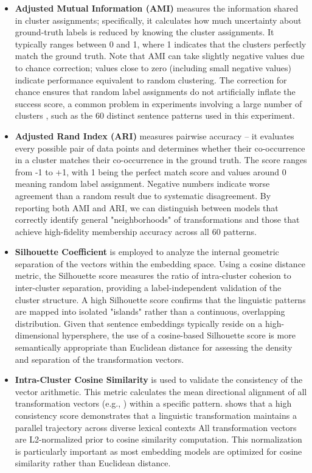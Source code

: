 \begin{itemize}
    \item \textbf{Adjusted Mutual Information (AMI)} \citep{JMLR:v11:vinh10a} measures the information shared in cluster assignments; specifically, it calculates how much uncertainty about ground-truth labels is reduced by knowing the cluster assignments. It typically ranges between 0 and 1, where 1 indicates that the clusters perfectly match the ground truth. Note that AMI can take slightly negative values due to chance correction; values close to zero (including small negative values) indicate performance equivalent to random clustering.
    The correction for chance ensures that random label assignments do not artificially inflate the success score, a common problem in experiments involving a large number of clusters \citep{JMLR:v11:vinh10a}, such as the 60 distinct sentence patterns used in this experiment. 

    \item \textbf{Adjusted Rand Index (ARI)} \citep{Hubert1985} measures pairwise accuracy --  it evaluates every possible pair of data points and determines whether their co-occurrence in a cluster matches their co-occurrence in the ground truth. The score ranges from -1 to +1, with 1 being the perfect match score and values around 0 meaning random label assignment. Negative numbers indicate worse agreement than a random result due to systematic disagreement. By reporting both AMI and ARI, we can distinguish between models that correctly identify general "neighborhoods" of transformations and those that achieve high-fidelity membership accuracy across all 60 patterns.

    \item \textbf{Silhouette Coefficient} \citep{Rousseeuw:1987} is employed to analyze the internal geometric separation of the vectors within the embedding space. Using a cosine distance metric, the Silhouette score measures the ratio of intra-cluster cohesion to inter-cluster separation, providing a label-independent validation of the cluster structure. A high Silhouette score confirms that the linguistic patterns are mapped into isolated "islands" rather than a continuous, overlapping distribution. Given that sentence embeddings typically reside on a high-dimensional hypersphere, the use of a cosine-based Silhouette score is more semantically appropriate than Euclidean distance for assessing the density and separation of the transformation vectors.

    \item \textbf{Intra-Cluster Cosine Similarity} is used to validate the consistency of the vector arithmetic. This metric calculates the mean directional alignment of all transformation vectors (e.g., ) within a specific pattern. \cite{mikolov-etal-2013-linguistic} shows that a high consistency score demonstrates that a linguistic transformation maintains a parallel trajectory across diverse lexical contexts All transformation vectors are L2-normalized prior to cosine similarity computation. This normalization is particularly important as most embedding models are optimized for cosine similarity rather than Euclidean distance.
       

\end{itemize}
